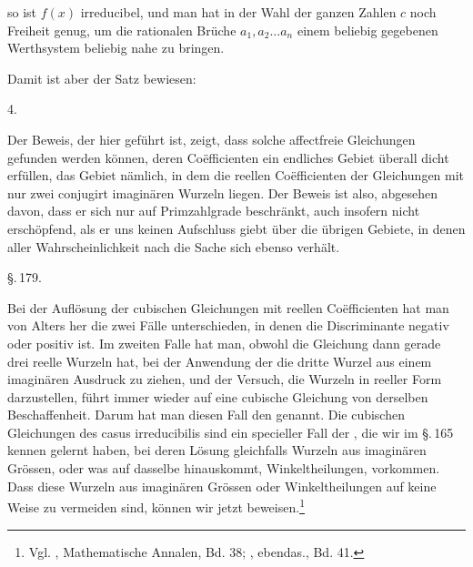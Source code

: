 so ist $f(x)$ irreducibel, und man hat in der Wahl der ganzen Zahlen $c$ noch Freiheit genug, um die rationalen Br\"uche $a_1, a_2 \ldots a_n$ einem beliebig gegebenen Werthsystem beliebig nahe zu bringen.

Damit ist aber der Satz bewiesen:

4. 

Der Beweis, der hier gef\"uhrt ist, zeigt, dass solche affectfreie Gleichungen gefunden werden k\"onnen, deren Co\"efficienten ein endliches Gebiet \"uberall dicht erf\"ullen, das Gebiet n\"amlich, in dem die reellen Co\"efficienten der Gleichungen mit nur zwei
conjugirt imagin\"aren Wurzeln liegen. Der Beweis ist also, abgesehen davon, dass er sich nur auf Primzahlgrade beschr\"ankt, auch insofern nicht ersch\"opfend, als er uns keinen Aufschluss giebt \"uber die \"ubrigen Gebiete, in denen aller Wahrscheinlichkeit nach die Sache sich ebenso verh\"alt.

\begin{center}
\S.\,179.

\end{center}

Bei der Aufl\"osung der cubischen Gleichungen mit reellen Co\"efficienten hat man von Alters her die zwei F\"alle unterschieden, in denen die Discriminante negativ oder positiv ist. Im zweiten Falle hat man, obwohl die Gleichung dann gerade drei reelle Wurzeln hat, bei der Anwendung der  die dritte Wurzel aus einem imagin\"aren Ausdruck zu ziehen, und der Versuch, die Wurzeln in reeller Form darzustellen, f\"uhrt immer wieder auf eine cubische Gleichung von derselben Beschaffenheit. Darum hat man diesen Fall den  genannt. Die cubischen Gleichungen des casus irreducibilis sind ein specieller Fall der , die wir im \S.\,165 kennen gelernt haben, bei deren L\"osung gleichfalls Wurzeln aus imagin\"aren Gr\"ossen, oder was auf dasselbe hinauskommt, Winkeltheilungen, vorkommen. Dass diese Wurzeln aus imagin\"aren Gr\"ossen oder Winkeltheilungen auf keine Weise zu vermeiden sind, k\"onnen wir jetzt beweisen.\footnote{Vgl. , Mathematische Annalen, Bd. 38; , ebendas., Bd. 41.}
